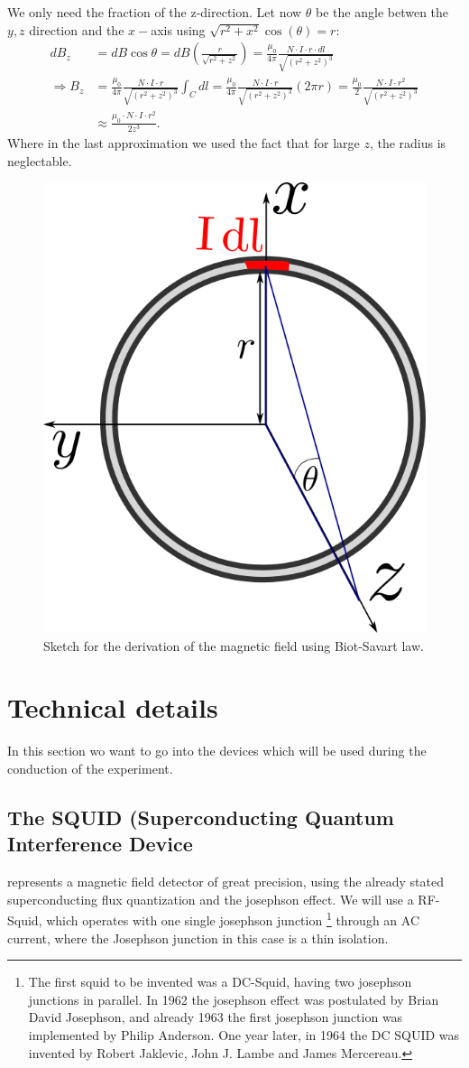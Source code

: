 We only need the fraction of the z-direction. Let now $\theta$ be the angle betwen the $y,z$ 
direction and the $x-$axis using $\sqrt{{r}^2 + x^2} \cos(\theta) = {r}$:
\begin{align}
     dB_z &= dB \cos\theta = dB \left (\frac{{r}}{\sqrt{{r}^2 + z^2}} \right) = 
    \frac{\mu_0}{4\pi} \frac{N\cdot I  \cdot {r} \cdot dl}{\sqrt{\left ({r}^2 + z^2 \right )^3}} \\
\Rightarrow B_z &= \frac{\mu_0}{4\pi} \frac{N\cdot I  \cdot {r}}{\sqrt{\left ({r}^2 + z^2 \right )^3}} \int_C dl 
  = \frac{\mu_0}{4\pi} \frac{N\cdot I  \cdot {r}}{\sqrt{\left ({r}^2 + z^2 \right )^3}} \left (2\pi {r} \right )
  =  \frac{\mu_0}{2} \frac{N\cdot I  \cdot {r}^2}{\sqrt{\left ({r}^2 + z^2 \right )^3}} \\
  &\approx \frac{\mu_0\cdot N \cdot I \cdot r^2}{2z^3}.
\end{align}
Where in the last approximation we used the fact that for large $z$, the
radius is neglectable.
\begin{figure}[htpb]
    \centering
    \includegraphics[width=0.4\linewidth]{figures/magnetic_field}
    \caption{Sketch for the derivation of the magnetic field using Biot-Savart law.}
    \label{fig:magnetic_field}
\end{figure}

\section{Technical details}
In this section wo want to go into the devices which will be used during the
conduction of the experiment.
\subsection{The SQUID (Superconducting Quantum Interference Device} represents a magnetic field
detector of great precision, using the already stated superconducting flux quantization and
the josephson effect. We will use a RF-Squid, which operates with one single josephson junction
\footnote{The first squid to be invented was a DC-Squid, having two josephson junctions in parallel. In 1962
the josephson effect was postulated by Brian David Josephson, and already 1963 the first josephson junction
was implemented by Philip Anderson. One year later, in 1964 the DC SQUID was invented by Robert Jaklevic, John J. Lambe
and James Mercereau.} through an AC current, where the Josephson junction in this case is a thin isolation.
